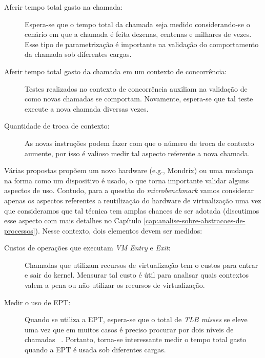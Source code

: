 \begin{description}
  \item [Aferir tempo total gasto na chamada:]

Espera-se que o tempo total da chamada seja medido considerando-se o cenário em
que a chamada é feita dezenas, centenas e milhares de vezes. Esse tipo de
parametrização é importante na validação do comportamento da chamada sob
diferentes cargas.

  \item [Aferir tempo total gasto da chamada em um contexto de concorrência:]

Testes realizados no contexto de concorrência auxiliam na validação de como
novas chamadas se comportam. Novamente, espera-se que tal teste execute
a nova chamada diversas vezes.

  \item [Quantidade de troca de contexto:]

As novas instruções podem fazer com que o número de troca de contexto aumente,
por isso é valioso medir tal aspecto referente a nova chamada.

\end{description}

Várias propostas propõem um novo hardware (e.g., Mondrix) ou uma mudança na
forma como um dispositivo é usado, o que torna importante validar alguns
aspectos de uso. Contudo, para a questão do \textit{microbenchmark} vamos
considerar apenas os aspectos referentes a reutilização do hardware de
virtualização uma vez que consideramos que tal técnica tem amplas chances de
ser adotada (discutimos esse aspecto com mais detalhes no Capítulo
\ref{cap:analise-sobre-abstracoes-de-processos}). Nesse contexto, dois
elementos devem ser medidos:

\begin{description}

  \item [Custos de operações que executam \textit{VM Entry} e \textit{Exit}:]

Chamadas que utilizam recursos de virtualização tem o custos para entrar e sair
do kernel. Mensurar tal custo é útil para analisar quais contextos valem a pena
ou não utilizar os recursos de virtualização.

  \item [Medir o uso de EPT:]

Quando se utiliza a EPT, espera-se que o total de \textit{TLB misses} se eleve
uma vez que em muitos casos é preciso procurar por dois níveis de chamadas
~\citep{belay}. Portanto, torna-se interessante medir o tempo total gasto
quando a EPT é usada sob diferentes cargas.

\end{description}

